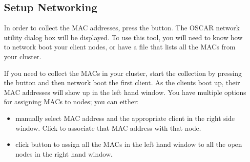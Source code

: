 

\subsection{Setup Networking}
\label{det:setup-networking}


In order to collect the MAC addresses, press the  button. The OSCAR network utility dialog box will be
displayed.  To use this tool, you will need to know how to network
boot your client nodes, or have a file that lists all the MACs from
your cluster.  

If you need to collect the MACs in your cluster, start the collection
by pressing the  button and then network
boot the first client.  As the clients boot up, their MAC addresses
will show up in the left hand window. You have multiple options for
assigning MACs to nodes; you can either:

\begin{itemize}
\item manually select MAC address and the appropriate client in the
  right side window. Click  to associate
  that MAC address with that node.
  
\item click  button to assign all the MACs in
  the left hand window to all the open nodes in the right hand window.
\end{itemize}

